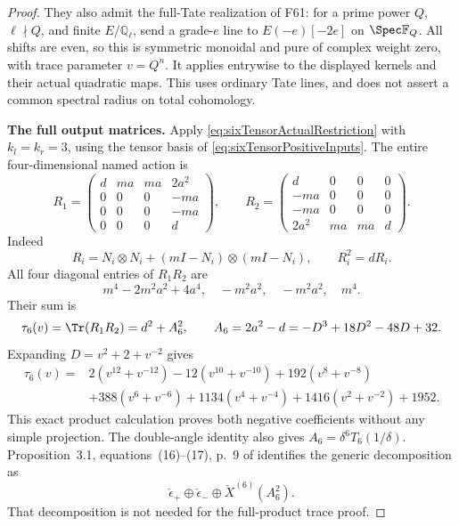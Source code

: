 \documentclass[11pt,a4paper]{article}
\newcommand{\Q}{\mathbb Q}\newcommand{\Z}{\mathbb Z}\newcommand{\C}{\mathbb C}\newcommand{\N}{\mathbb N}\newcommand{\F}{\mathbb F}
\newcommand{\fid}[1]{\textsf{#1}}\newcommand{\gate}[1]{\textsf{#1}}
\theoremstyle{named}\newtheorem{finding}{Finding}[section]
\theoremstyle{definition}\newtheorem{definition}[finding]{Definition}
\theoremstyle{remark}\newtheorem{remark}[finding]{Remark}
\begin{document}
\begin{proof}
They also admit the full-Tate realization of
\fid{F61}: for a prime power \(Q\),
\(\ell\nmid Q\), and finite \(E/\Q_\ell\),
send a grade-\(e\) line to \(E(-e)[-2e]\)
on \(\Spec\F_Q\).
All shifts are even, so this is symmetric
monoidal and pure of complex weight zero,
with trace parameter \(v=Q^n\).
It applies entrywise to the displayed kernels
and their actual quadratic maps.
This uses ordinary Tate lines, and does not
assert a common spectral radius on total cohomology.

\par\smallskip\noindent\textbf{The full output matrices.}\quad
Apply \eqref{eq:sixTensorActualRestriction}
with \(k_l=k_r=3\), using the tensor basis
of \eqref{eq:sixTensorPositiveInputs}.
The entire four-dimensional named action is
\begin{equation}\label{eq:sixTensorActualMatrices}
 R_1=\begin{pmatrix}
 d&ma&ma&2a^2\\0&0&0&-ma\\0&0&0&-ma\\0&0&0&d
 \end{pmatrix},\qquad
 R_2=\begin{pmatrix}
 d&0&0&0\\-ma&0&0&0\\-ma&0&0&0\\2a^2&ma&ma&d
 \end{pmatrix}.
\end{equation}
Indeed
\[
 R_i=N_i\otimes N_i+(mI-N_i)\otimes(mI-N_i),
 \qquad R_i^2=dR_i.
\]
All four diagonal entries of \(R_1R_2\) are
\begin{equation}\label{eq:sixTensorFullDiagonal}
 m^4-2m^2a^2+4a^4,\quad -m^2a^2,\quad
              -m^2a^2,\quad m^4.
\end{equation}
Their sum is
\begin{equation}\label{eq:sixTensorTraceIdentity}
 \tau_6(v)=\Tr(R_1R_2)=d^2+A_6^2,
 \qquad
 A_6=2a^2-d=-D^3+18D^2-48D+32.
\end{equation}
Expanding \(D=v^2+2+v^{-2}\) gives
\begin{equation}\label{eq:sixTensorNegativeTrace}
\begin{split}
 \tau_6(v)={}&2(v^{12}+v^{-12})-12(v^{10}+v^{-10})
                  +192(v^8+v^{-8})\\
 &+388(v^6+v^{-6})+1134(v^4+v^{-4})
                  +1416(v^2+v^{-2})+1952.
\end{split}
\end{equation}
This exact product calculation proves both
negative coefficients without any simple projection.
The double-angle identity also gives
\(A_6=\delta^6T_6(1/\delta)\).
Proposition~3.1, equations~(16)--(17), p.~9
of \cite{BlasiakChebyshev} identifies the generic
decomposition as
\[
 \check\epsilon_+\oplus\check\epsilon_-
                 \oplus\check X^{(6)}(A_6^2).
\]
That decomposition is not needed for the
full-product trace proof.


\end{proof}
\end{document}
